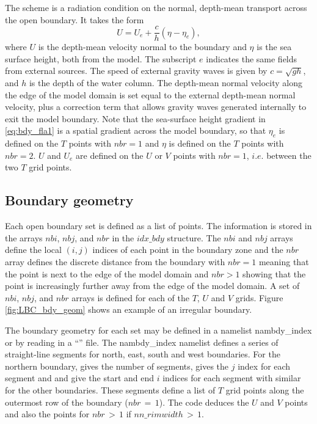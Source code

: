 \documentclass[../main/NEMO_manual]{subfiles}
\begin{document}
The \citet{Flather_JPO94} scheme is a radiation condition on the normal,
depth-mean transport across the open boundary.
It takes the form
\begin{equation}  \label{eq:bdy_fla1}
U = U_{e} + \frac{c}{h}\left(\eta - \eta_{e}\right),
\end{equation}
where $U$ is the depth-mean velocity normal to the boundary and $\eta$ is the sea surface height,
both from the model.
The subscript $e$ indicates the same fields from external sources.
The speed of external gravity waves is given by $c = \sqrt{gh}$, and $h$ is the depth of the water column.
The depth-mean normal velocity along the edge of the model domain is set equal to
the external depth-mean normal velocity,
plus a correction term that allows gravity waves generated internally to exit the model boundary.
Note that the sea-surface height gradient in \autoref{eq:bdy_fla1} is a spatial gradient across the model boundary,
so that $\eta_{e}$ is defined on the $T$ points with $nbr=1$ and $\eta$ is defined on the $T$ points with $nbr=2$.
$U$ and $U_{e}$ are defined on the $U$ or $V$ points with $nbr=1$, $i.e.$ between the two $T$ grid points.

\subsection{Boundary geometry}
\label{subsec:BDY_geometry}

Each open boundary set is defined as a list of points.
The information is stored in the arrays $nbi$, $nbj$, and $nbr$ in the $idx\_bdy$ structure.
The $nbi$ and $nbj$ arrays define the local $(i,j)$ indices of each point in the boundary zone and
the $nbr$ array defines the discrete distance from the boundary with $nbr=1$ meaning that
the point is next to the edge of the model domain and $nbr>1$ showing that
the point is increasingly further away from the edge of the model domain.
A set of $nbi$, $nbj$, and $nbr$ arrays is defined for each of the $T$, $U$ and $V$ grids.
Figure \autoref{fig:LBC_bdy_geom} shows an example of an irregular boundary. 

The boundary geometry for each set may be defined in a namelist nambdy\_index or
by reading in a ``'' file.
The nambdy\_index namelist defines a series of straight-line segments for north, east, south and west boundaries.
For the northern boundary,  gives the number of segments,
 gives the $j$ index for each segment and  and
 give the start and end $i$ indices for each segment with similar for the other boundaries.
These segments define a list of $T$ grid points along the outermost row of the boundary ($nbr\,=\, 1$).
The code deduces the $U$ and $V$ points and also the points for $nbr\,>\, 1$ if $nn\_rimwidth\,>\,1$.
\end{document}
